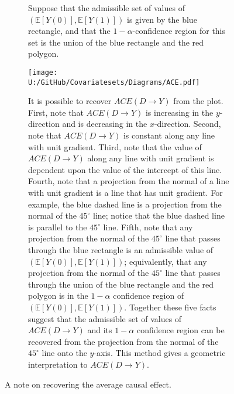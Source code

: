 \documentclass[10pt,a4paper,twoside]{article}
\numberwithin{equation}{section}
\begin{document}
\begin{figure}[p]
\centering
\begin{subfigure}{0.8\textwidth}
\caption{Suppose that the admissible set of values of $(\mathbb{E}[Y(0)],\mathbb{E}[Y(1)])$ is given by the blue rectangle, and that the $1-\alpha$-confidence region for this set is the union of the blue rectangle and the red polygon. }
\texttt{[image: U:/GitHub/Covariatesets/Diagrams/ACE.pdf]}
\caption{It is possible to recover $ACE(D\rightarrow Y)$ from the plot. First, note that $ACE(D\rightarrow Y)$ is increasing in the $y$-direction and is decreasing in the $x$-direction. Second, note that $ACE(D\rightarrow Y)$ is constant along any line with unit gradient. Third, note that the value of $ACE(D\rightarrow Y)$ along any line with unit gradient is dependent upon the value of the intercept of this line. Fourth, note that a projection from the normal of a line with unit gradient is a line that has unit gradient. For example, the blue dashed line is a projection from the normal of the $45^\circ$ line; notice that the blue dashed line is parallel to the $45^\circ$ line. Fifth, note that any projection from the normal of the $45^\circ$ line that passes through the blue rectangle is an admissible value of $(\mathbb{E}[Y(0)],\mathbb{E}[Y(1)])$; equivalently, that any projection from the normal of the $45^\circ$ line that passes through the union of the blue rectangle and the red polygon is in the $1-\alpha$ confidence region of $(\mathbb{E}[Y(0)],\mathbb{E}[Y(1)])$. Together these five facts suggest that the admissible set of values of $ACE(D\rightarrow Y)$ and its $1-\alpha$ confidence region can be recovered from the projection from the normal of the $45^\circ$ line onto the $y$-axis. This method gives a geometric interpretation to $ACE(D\rightarrow Y)$.}
\end{subfigure}
\caption{A note on recovering the average causal effect.}
\label{fig:ace}
\end{figure}
\end{document}
